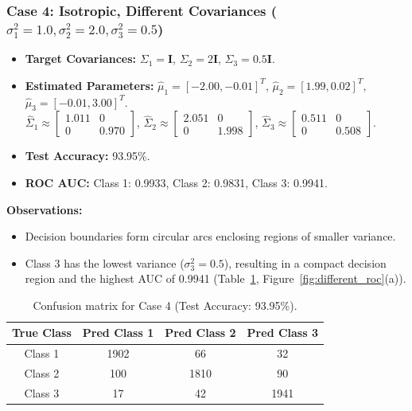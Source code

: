 \documentclass[11pt,a4paper]{article}
\begin{document}
\subsubsection{Case 4: Isotropic, Different Covariances ($\sigma_1^2=1.0,\sigma_2^2=2.0,\sigma_3^2=0.5$)}
\begin{itemize}
  \item \textbf{Target Covariances:} $\Sigma_1=\mathbf{I}$, $\Sigma_2=2\mathbf{I}$, $\Sigma_3=0.5\mathbf{I}$.
  \item \textbf{Estimated Parameters:} $\hat{\mu}_1=[-2.00,-0.01]^T$, $\hat{\mu}_2=[1.99,0.02]^T$, $\hat{\mu}_3=[-0.01,3.00]^T$.\\
  $\hat{\Sigma}_1\approx\begin{bmatrix}1.011&0\\0&0.970\end{bmatrix}$,
  $\hat{\Sigma}_2\approx\begin{bmatrix}2.051&0\\0&1.998\end{bmatrix}$,
  $\hat{\Sigma}_3\approx\begin{bmatrix}0.511&0\\0&0.508\end{bmatrix}$.
  \item \textbf{Test Accuracy:} 93.95\%.
  \item \textbf{ROC AUC:} Class 1: 0.9933, Class 2: 0.9831, Class 3: 0.9941.
\end{itemize}
\textbf{Observations:}
\begin{itemize}
  \item Decision boundaries form circular arcs enclosing regions of smaller variance.
  \item Class 3 has the lowest variance ($\sigma_3^2=0.5$), resulting in a compact decision region and the highest AUC of 0.9941 (Table~\ref{tab:c4}, Figure~\ref{fig:different_roc}(a)).
\end{itemize}

\begin{table}[ht]
\centering
\begin{tabular}{cccc}
\toprule
\textbf{True Class} & \textbf{Pred Class 1} & \textbf{Pred Class 2} & \textbf{Pred Class 3}\\
\midrule
Class 1 & 1902 & 66 & 32\\
Class 2 & 100 & 1810 & 90\\
Class 3 & 17 & 42 & 1941\\
\bottomrule
\end{tabular}
\caption{Confusion matrix for Case 4 (Test Accuracy: 93.95\%).}
\label{tab:c4}
\end{table}
\end{document}
